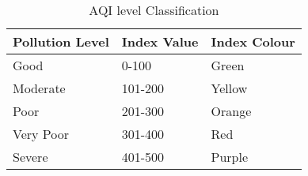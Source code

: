 \begin{table}
	\centering
    \begin{adjustbox}{width=\textwidth}
    \begin{tabular}{|p{3cm}|p{3cm}|p{3cm}|}
		\hline
		\textbf{Pollution Level} & \textbf{Index Value} & \textbf{Index Colour} \\
		\hline
		Good & 0-100 & Green \\
		\hline
		Moderate & 101-200 & Yellow \\
		\hline
		Poor & 201-300 & Orange \\
		\hline
		Very Poor & 301-400 & Red \\
		\hline
		Severe & 401-500 & Purple \\
		\hline

	\end{tabular}
	\end{adjustbox}
\caption{AQI level Classification}
\end{table}